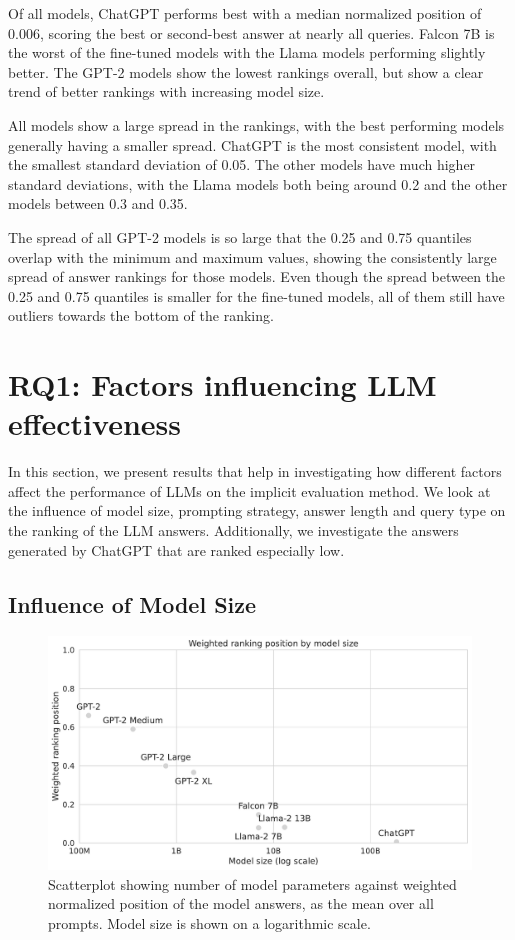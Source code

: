 Of all models, ChatGPT performs best with a median normalized position of 0.006, scoring the best or second-best answer at nearly all queries.
Falcon 7B is the worst of the fine-tuned models with the Llama models performing slightly better.
The GPT-2 models show the lowest rankings overall, but show a clear trend of better rankings with increasing model size.

All models show a large spread in the rankings, with the best performing models generally having a smaller spread.
ChatGPT is the most consistent model, with the smallest standard deviation of 0.05.
The other models have much higher standard deviations, with the Llama models both being around 0.2 and the other models between 0.3 and 0.35.

The spread of all GPT-2 models is so large that the 0.25 and 0.75 quantiles overlap with the minimum and maximum values, showing the consistently large spread of answer rankings for those models.
Even though the spread between the 0.25 and 0.75 quantiles is smaller for the fine-tuned models, all of them still have outliers towards the bottom of the ranking.


\section{RQ1: Factors influencing LLM effectiveness}
In this section, we present results that help in investigating how different factors affect the performance of LLMs on the implicit evaluation method.
We look at the influence of model size, prompting strategy, answer length and query type on the ranking of the LLM answers.
Additionally, we investigate the answers generated by ChatGPT that are ranked especially low.

\subsection{Influence of Model Size}
\begin{figure}
    \centering
    \includegraphics[width=\textwidth]{images/weighted_position_vs_model_size.pdf}
    \caption{Scatterplot showing number of model parameters against weighted normalized position of the model answers, as the mean over all prompts. Model size is shown on a logarithmic scale.}
    \label{fig:weighted_position_vs_model_size}
\end{figure}


